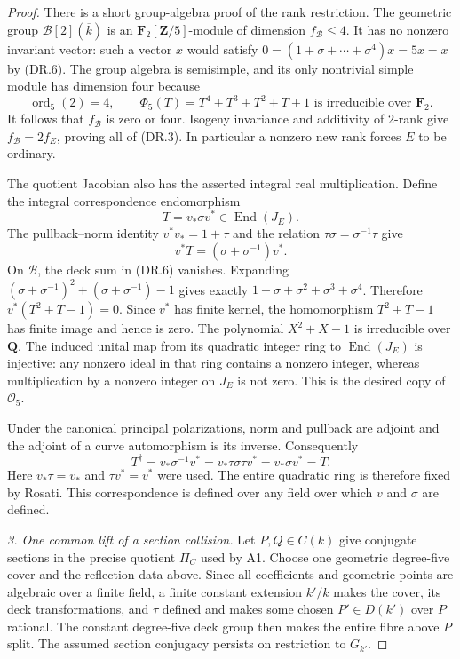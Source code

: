 \documentclass[11pt,a4paper]{article}
\begin{document}
\begin{proof}
There is a short group-algebra proof of the rank restriction.  The
geometric group $\mathcal B[2](\overline k)$ is an
$\mathbf F_2[\mathbf Z/5]$-module of dimension $f_{\mathcal B}\le4$.
It has no nonzero invariant vector: such a vector $x$ would satisfy
$0=(1+\sigma+\cdots+\sigma^4)x=5x=x$ by (DR.6).
The group algebra is semisimple, and its only nontrivial simple module
has dimension four because
\[
             \operatorname{ord}_5(2)=4,
             \qquad \Phi_5(T)=T^4+T^3+T^2+T+1
             \text{ is irreducible over }\mathbf F_2.
 \tag{DR.7}
\]
It follows that $f_{\mathcal B}$ is zero or four.  Isogeny invariance
and additivity of $2$-rank give $f_{\mathcal B}=2f_E$, proving all of
(DR.3).  In particular a nonzero new rank forces $E$ to be ordinary.

The quotient Jacobian also has the asserted integral real
multiplication.  Define the integral correspondence endomorphism
\[
                   T=v_*\sigma v^*\in\operatorname{End}(J_E).
 \tag{DR.7a}
\]
The pullback--norm identity $v^*v_*=1+\tau$ and the relation
$\tau\sigma=\sigma^{-1}\tau$ give
\[
            v^*T=(\sigma+\sigma^{-1})v^*.
 \tag{DR.7b}
\]
On $\mathcal B$, the deck sum in (DR.6) vanishes.  Expanding
$(\sigma+\sigma^{-1})^2+(\sigma+\sigma^{-1})-1$ gives exactly
$1+\sigma+\sigma^2+\sigma^3+\sigma^4$.  Therefore
$v^*(T^2+T-1)=0$.  Since $v^*$ has finite kernel, the homomorphism
$T^2+T-1$ has finite image and hence is zero.  The polynomial
$X^2+X-1$ is irreducible over $\mathbf Q$.  The induced unital map
from its quadratic integer ring to $\operatorname{End}(J_E)$ is
injective: any nonzero ideal in that ring contains a nonzero integer,
whereas multiplication by a nonzero integer on $J_E$ is not zero.
This is the desired copy of $\mathcal O_5$.

Under the canonical principal polarizations, norm and pullback are
adjoint and the adjoint of a curve automorphism is its inverse.
Consequently
\[
 T^{\dagger}=v_*\sigma^{-1}v^*
            =v_*\tau\sigma\tau v^*=v_*\sigma v^*=T.
 \tag{DR.7c}
\]
Here $v_*\tau=v_*$ and $\tau v^*=v^*$ were used.  The entire
quadratic ring is therefore fixed by Rosati.  This correspondence is
defined over any field over which $v$ and $\sigma$ are defined.

\emph{3. One common lift of a section collision.}
Let $P,Q\in C(k)$ give conjugate sections in the precise quotient
$\Pi_C$ used by A1.  Choose one geometric degree-five cover and the
reflection data above.  Since all coefficients and geometric points
are algebraic over a finite field, a finite constant extension $k'/k$
makes the cover, its deck transformations, and $\tau$ defined and makes
some chosen $P'\in D(k')$ over $P$ rational.  The constant degree-five
deck group then makes the entire fibre above $P$ split.  The assumed
section conjugacy persists on restriction to $G_{k'}$.


\end{proof}
\end{document}
